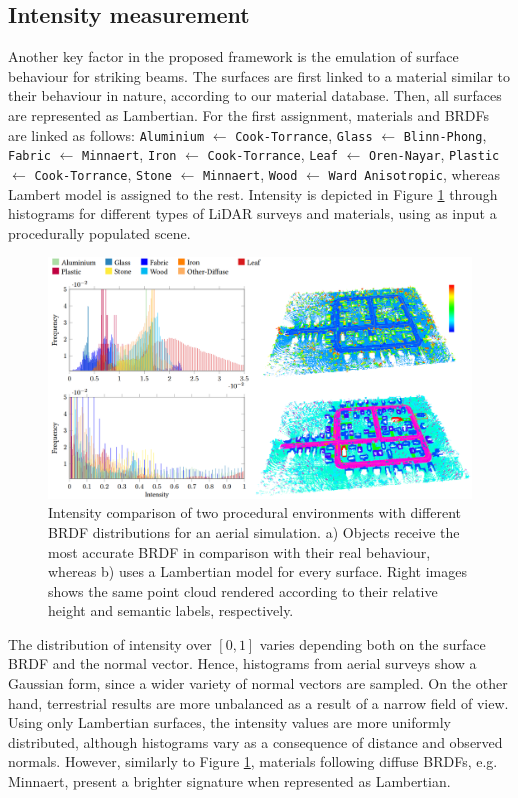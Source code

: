 \subsection{Intensity measurement}

Another key factor in the proposed framework is the emulation of surface behaviour for striking beams. The surfaces are first linked to a material similar to their behaviour in nature, according to our material database. Then, all surfaces are represented as Lambertian. For the first assignment, materials and BRDFs are linked as follows: \verb|Aluminium| $\gets$ \verb|Cook-Torrance|, \verb|Glass| $\gets$ \verb|Blinn-Phong|, \verb|Fabric| $\gets$ \verb|Minnaert|, \verb|Iron| $\gets$ \verb|Cook-Torrance|, \verb|Leaf| $\gets$ \verb|Oren-Nayar|, \verb|Plastic| $\gets$ \verb|Cook-Torrance|, \verb|Stone| $\gets$ \verb|Minnaert|, \verb|Wood| $\gets$ \verb|Ward Anisotropic|, whereas Lambert model is assigned to the rest. Intensity is depicted in Figure \ref{fig:analytical_brdf_results} through histograms for different types of LiDAR surveys and materials, using as input a procedurally populated scene.

\begin{figure}[ht]
	\centering
	\includegraphics[width=\linewidth]{figs/lidar_intensity/analytical_brdf_intensity_chart.png}
	\caption{Intensity comparison of two procedural environments with different BRDF distributions for an aerial simulation. a) Objects receive the most accurate BRDF in comparison with their real behaviour, whereas b) uses a Lambertian model for every surface. Right images shows the same point cloud rendered according to their relative height and semantic labels, respectively.}
	\label{fig:analytical_brdf_results}
\end{figure}

The distribution of intensity over $[0, 1]$ varies depending both on the surface BRDF and the normal vector. Hence, histograms from aerial surveys show a Gaussian form, since a wider variety of normal vectors are sampled. On the other hand, terrestrial results are more unbalanced as a result of a narrow field of view. Using only Lambertian surfaces, the intensity values are more uniformly distributed, although histograms vary as a consequence of distance and observed normals. However, similarly to Figure \ref{fig:analytical_brdf_results}, materials following diffuse BRDFs, e.g. Minnaert, present a brighter signature when represented as Lambertian.

